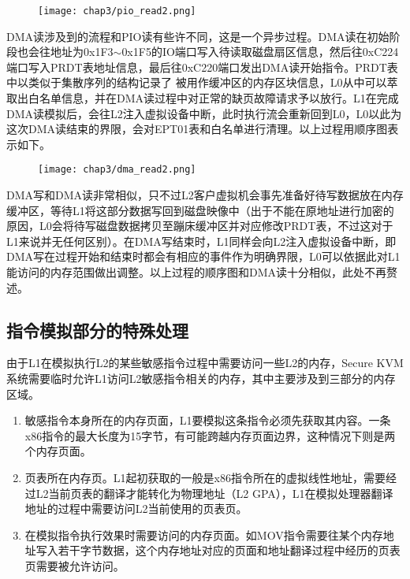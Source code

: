 \begin{figure}[!htbp]
  \centering
  \texttt{[image: chap3/pio\_read2.png]}
\end{figure}

DMA读涉及到的流程和PIO读有些许不同，这是一个异步过程。DMA读在初始阶段也会往地址为0x1F3$\sim$0x1F5的IO端口写入待读取磁盘扇区信息，然后往0xC224端口写入PRDT表地址信息，最后往0xC220端口发出DMA读开始指令。PRDT表中以类似于集散序列的结构记录了
被用作缓冲区的内存区块信息，L0从中可以萃取出白名单信息，并在DMA读过程中对正常的缺页故障请求予以放行。L1在完成DMA读模拟后，会往L2注入虚拟设备中断，此时执行流会重新回到L0，L0以此为这次DMA读结束的界限，会对EPT01表和白名单进行清理。以上过程用顺序图表示如下。

\begin{figure}[!htbp]
  \centering
  \texttt{[image: chap3/dma\_read2.png]}
\end{figure}

DMA写和DMA读非常相似，只不过L2客户虚拟机会事先准备好待写数据放在内存缓冲区，等待L1将这部分数据写回到磁盘映像中（出于不能在原地址进行加密的原因，L0会将待写磁盘数据拷贝至蹦床缓冲区并对应修改PRDT表，不过这对于L1来说并无任何区别）。在DMA写结束时，L1同样会向L2注入虚拟设备中断，即DMA写在过程开始和结束时都会有相应的事件作为明确界限，L0可以依据此对L1能访问的内存范围做出调整。以上过程的顺序图和DMA读十分相似，此处不再赘述。

\subsection{指令模拟部分的特殊处理}

由于L1在模拟执行L2的某些敏感指令过程中需要访问一些L2的内存，Secure KVM系统需要临时允许L1访问L2敏感指令相关的内存，其中主要涉及到三部分的内存区域。

\begin{enumerate}
\item 敏感指令本身所在的内存页面，L1要模拟这条指令必须先获取其内容。一条x86指令的最大长度为15字节，有可能跨越内存页面边界，这种情况下则是两个内存页面。
\item 页表所在内存页。L1起初获取的一般是x86指令所在的虚拟线性地址，需要经过L2当前页表的翻译才能转化为物理地址（L2 GPA），L1在模拟处理器翻译地址的过程中需要访问L2当前使用的页表页。
\item 在模拟指令执行效果时需要访问的内存页面。如MOV指令需要往某个内存地址写入若干字节数据，这个内存地址对应的页面和地址翻译过程中经历的页表页需要被允许访问。
\end{enumerate}

